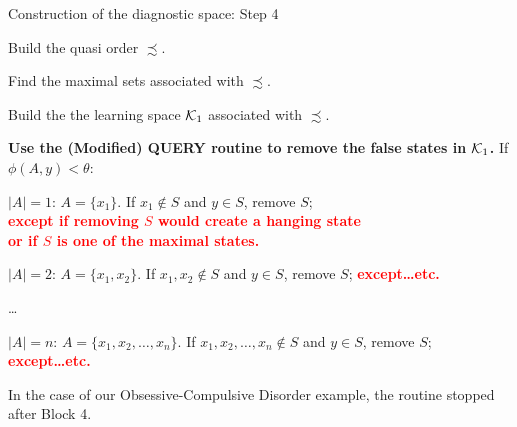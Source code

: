 \documentclass{beamer}
\def\hh{\theta}
\def\KKK{{\cal K}}
\def\rtxt#1{\textcolor{red}{#1}}
\begin{document}
\begin{frame}{Construction of the diagnostic space: Step 4}
\hspace{-.5cm}
\vspace{-.8cm}

\center
\begin{minipage}{11cm} 
\begin{roster}
\item[1.]   Build the quasi order $\precsim$.
\item[2.]  Find the maximal sets associated with $\precsim$. 
\item[3.] Build the the learning space $\KKK_1$ associated with $\precsim$.
\item[4.] {\bf Use the {\sc (Modified) QUERY} routine to remove the false states in $\KKK_1$.} 
If  $\phi(A,y)< \hh$:
\begin{roster}
\item[{\bf Block 1.}] $|A|=1$: $A=\{x_1\}$. If  $x_1\notin S$ and $y\in S$, remove $S$; \\
\rtxt{\bf except if removing $S$ would create a hanging state\\ or if $S$ is one of the maximal states.}
\item[{\bf Block 2.}] $|A|= 2$: $A=\{x_1,x_2\}$. If  $x_1, x_2\notin S$ and $y\in S$, remove $S$;
\rtxt{\bf except\dots etc.}
\item[{\bf ...}]\dots
\item[{\bf Block n.}] $|A|= n$: $A=\{x_1,x_2,\ldots,x_n\}$. If  $x_1, x_2,\ldots,x_n\notin S$ and $y\in S$, remove $S$;\\
\rtxt{\bf except\dots etc.}
\end{roster}
 


 

 In the case of our Obsessive-Compulsive Disorder example, the routine stopped after Block 4.   
\end{roster}
\end{minipage} 
\end{frame}
\end{document}
